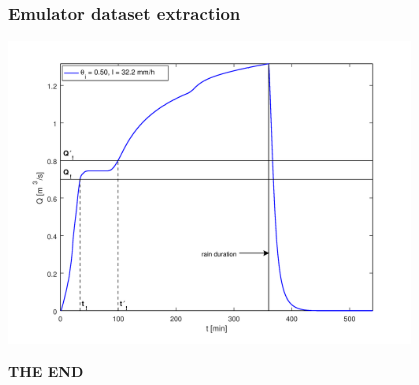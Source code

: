 \documentclass[xcolor=dvipsnames, USenglish]{beamer}  %
\begin{document}
  \begin{frame}
    \frametitle{Emulator dataset extraction}
    \centering
    \includegraphics[width=0.8\textwidth]{img/hydrograph.png}
  \end{frame}




  {
  \begin{frame}[plain]
    \centering
    \Large{\textbf{THE END}}\\
  \end{frame}
  }



\end{document}

